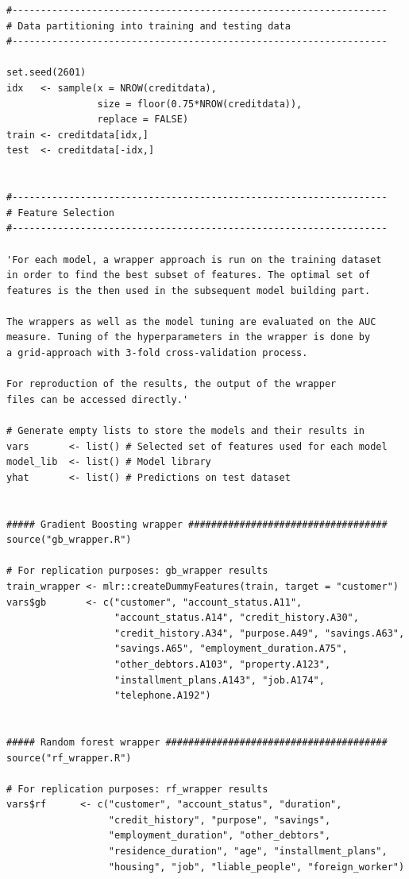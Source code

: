 \documentclass[12pt]{article}
\begin{document}
\begin{lstlisting}
#------------------------------------------------------------------
# Data partitioning into training and testing data
#------------------------------------------------------------------

set.seed(2601)
idx   <- sample(x = NROW(creditdata),
                size = floor(0.75*NROW(creditdata)), 
                replace = FALSE)
train <- creditdata[idx,]
test  <- creditdata[-idx,]


#------------------------------------------------------------------
# Feature Selection
#------------------------------------------------------------------

'For each model, a wrapper approach is run on the training dataset 
in order to find the best subset of features. The optimal set of
features is the then used in the subsequent model building part. 

The wrappers as well as the model tuning are evaluated on the AUC
measure. Tuning of the hyperparameters in the wrapper is done by 
a grid-approach with 3-fold cross-validation process. 

For reproduction of the results, the output of the wrapper 
files can be accessed directly.'

# Generate empty lists to store the models and their results in
vars       <- list() # Selected set of features used for each model
model_lib  <- list() # Model library
yhat       <- list() # Predictions on test dataset


##### Gradient Boosting wrapper ###################################
source("gb_wrapper.R")

# For replication purposes: gb_wrapper results
train_wrapper <- mlr::createDummyFeatures(train, target = "customer")
vars$gb       <- c("customer", "account_status.A11", 
                   "account_status.A14", "credit_history.A30",
                   "credit_history.A34", "purpose.A49", "savings.A63",
                   "savings.A65", "employment_duration.A75",
                   "other_debtors.A103", "property.A123",
                   "installment_plans.A143", "job.A174",
                   "telephone.A192")       


##### Random forest wrapper #######################################
source("rf_wrapper.R")

# For replication purposes: rf_wrapper results
vars$rf      <- c("customer", "account_status", "duration", 
                  "credit_history", "purpose", "savings",
                  "employment_duration", "other_debtors",
                  "residence_duration", "age", "installment_plans",
                  "housing", "job", "liable_people", "foreign_worker")



\end{lstlisting}
\end{document}
